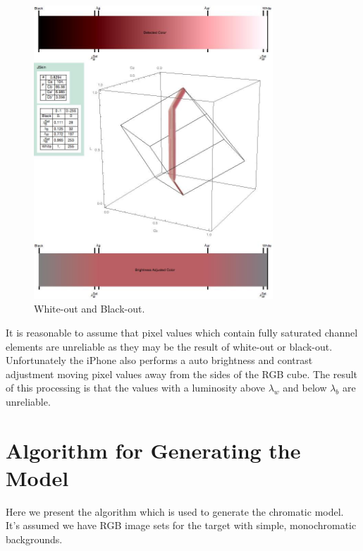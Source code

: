 \begin{figure}[h!] %
  \centering
    \includegraphics[width=0.80\textwidth]{Chapter3/Figs/WOBOFig.jpg}
    \caption{White-out and Black-out.}  \label{fig:WoBo1}
\end{figure}

It is reasonable to assume that pixel values which contain fully saturated channel elements are unreliable as they may be the result of white-out or black-out. Unfortunately the iPhone also performs a auto brightness and contrast adjustment moving pixel values away from the sides of the RGB cube. The result of this processing is that the values with a luminosity above $\lambda_w$ and below $\lambda_b$ are unreliable.

\section{Algorithm for Generating the Model}\label{sec:AlgorithmForGeneratingModel}
Here we present the algorithm which is used to generate the chromatic model. It's assumed we have RGB image sets for the target with simple, monochromatic backgrounds.



